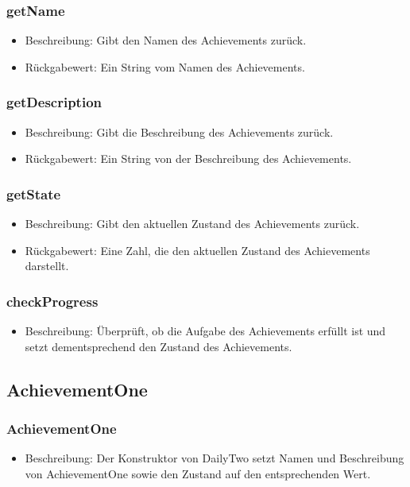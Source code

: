 \documentclass[a4paper]{scrreprt}
\begin{document}
	\subsubsection{getName}
	\begin{itemize}
		\item Beschreibung: Gibt den Namen des Achievements zurück.
		\item Rückgabewert: Ein String vom Namen des Achievements.
	\end{itemize}
	\subsubsection{getDescription}
	\begin{itemize}
		\item Beschreibung: Gibt die Beschreibung des Achievements zurück.
		\item Rückgabewert: Ein String von der Beschreibung des Achievements.
	\end{itemize}
	\subsubsection{getState}
	\begin{itemize}
		\item Beschreibung: Gibt den aktuellen Zustand des Achievements zurück.
		\item Rückgabewert: Eine Zahl, die den aktuellen Zustand des Achievements darstellt.
	\end{itemize}
	\subsubsection{checkProgress}
	\begin{itemize}
		\item Beschreibung: Überprüft, ob die Aufgabe des Achievements erfüllt ist und setzt dementsprechend den Zustand des Achievements.
	\end{itemize}
	
	\subsection{AchievementOne}
	\subsubsection{AchievementOne}
	\begin{itemize}
		\item Beschreibung: Der Konstruktor von DailyTwo setzt Namen und Beschreibung von AchievementOne sowie den Zustand auf den entsprechenden Wert.
	\end{itemize}
\end{document}
